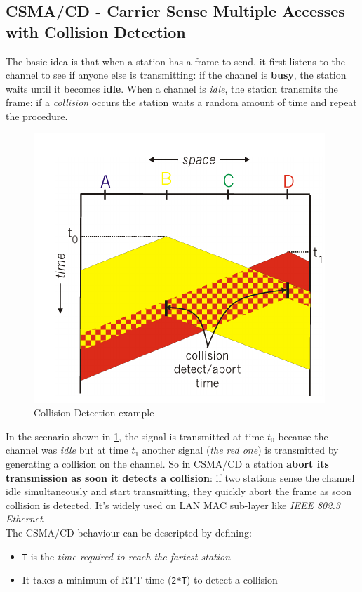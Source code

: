 \documentclass[10pt,a4paper]{report}
\theoremstyle{definition}
\begin{document}
\subsection{CSMA/CD - Carrier Sense Multiple Accesses with Collision Detection}\label{sec:cmsacd---carrier-sense-multiple-accesses-with-collision-detection}
The basic idea is that when a station has a frame to send, it first listens to the channel to see if anyone else is transmitting: if the channel is \textbf{busy}, the station waits until it becomes \textbf{idle}. When a channel is \textit{idle}, the station transmits the frame: if a \textit{collision} occurs the station waits a random amount of time and repeat the procedure.
\begin{figure}[h]
	\centering\includegraphics[scale=0.50]{images/Pasted image 20230224171228.png}
	\caption{Collision Detection example}
	\label{collision-schema}
\end{figure}

In the scenario shown in \ref{collision-schema}, the signal is transmitted at time $t_{0}$ because the channel was \textit{idle} but at time $t_{1}$ another signal (\textit{the red one}) is transmitted by generating a collision on the channel.
So in CSMA/CD a station \textbf{abort its transmission as soon it detects a collision}: if two stations sense the channel idle simultaneously and start transmitting, they quickly abort the frame as soon collision is detected. It's widely used on LAN MAC sub-layer like \textit{IEEE 802.3 Ethernet}.\\
The CSMA/CD behaviour can be descripted by defining:
\begin{itemize}
	\item 
	\texttt{T} is the \textit{time required to reach the fartest station}
	\item 
	It takes a minimum of RTT time (\texttt{2*T}) to detect a collision
	
\end{itemize}
\end{document}

